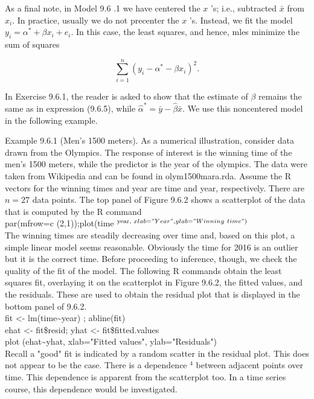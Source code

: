 As a final note, in Model 9.6 .1 we have centered the $x$ 's; i.e., subtracted $\bar{x}$ from $x_{i}$. In practice, usually we do not precenter the $x$ 's. Instead, we fit the model $y_{i}=\alpha^{*}+\beta x_{i}+e_{i}$. In this case, the least squares, and hence, mles minimize the sum of squares


\begin{equation*}
\sum_{i=1}^{n}\left(y_{i}-\alpha^{*}-\beta x_{i}\right)^{2} . \tag{9.6.11}
\end{equation*}


In Exercise 9.6.1, the reader is asked to show that the estimate of $\beta$ remains the same as in expression (9.6.5), while $\hat{\alpha}^{*}=\bar{y}-\hat{\beta} \bar{x}$. We use this noncentered model in the following example.

Example 9.6.1 (Men's 1500 meters). As a numerical illustration, consider data drawn from the Olympics. The response of interest is the winning time of the men's 1500 meters, while the predictor is the year of the olympics. The data were taken from Wikipedia and can be found in olym1500mara.rda. Assume the R vectors for the winning times and year are time and year, respectively. There are $n=27$ data points. The top panel of Figure 9.6.2 shows a scatterplot of the data that is computed by the R command\\
par(mfrow=c (2,1));plot(time ${ }^{\text {year, } x l a b=" Y e a r ", y l a b=" W i n n i n g ~ t i m e ") ~}$\\
The winning times are steadily decreasing over time and, based on this plot, a simple linear model seems reasonable. Obviously the time for 2016 is an outlier but it is the correct time. Before proceeding to inference, though, we check the quality of the fit of the model. The following R commands obtain the least squares fit, overlaying it on the scatterplot in Figure 9.6.2, the fitted values, and the residuals. These are used to obtain the residual plot that is displayed in the bottom panel of 9.6.2.\\
fit <- lm(time\~{}year) ; abline(fit)\\
ehat <- fit\$resid; yhat <- fit\$fitted.values\\
plot (ehat\~{}yhat, xlab="Fitted values", ylab="Residuals")\\
Recall a "good" fit is indicated by a random scatter in the residual plot. This does not appear to be the case. There is a dependence ${ }^{4}$ between adjacent points over time. This dependence is apparent from the scatterplot too. In a time series course, this dependence would be investigated.

